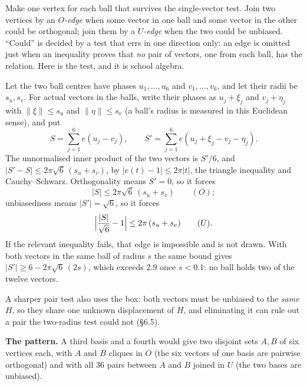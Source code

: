 \documentclass[11pt]{article}
\newcommand{\abs}[1]{\lvert #1\rvert}
\newcommand{\norm}[1]{\lVert #1\rVert}
\newcommand{\key}[1]{\par\Needspace{4\baselineskip}\medskip\noindent{\normalsize\bfseries #1}\par\nobreak\vspace{-1pt}}
\begin{document}
\key{5.\ Two graphs, and the pattern}

Make one vertex for each ball that survives the single-vector test. Join two vertices by an
\emph{$O$-edge} when some vector in one ball and some vector in the other could be orthogonal; join them
by a \emph{$U$-edge} when the two could be unbiased. ``Could'' is decided by a test that errs in one
direction only: an edge is omitted just when an inequality proves that \emph{no} pair of vectors, one
from each ball, has the relation. Here is the test, and it is school algebra.

Let the two ball centres have phases $u_1,\dots,u_6$ and $v_1,\dots,v_6$, and let their radii be
$s_u,s_v$. For actual vectors in the balls, write their phases as $u_j+\xi_j$ and $v_j+\eta_j$ with
$\norm{\xi}\le s_u$ and $\norm{\eta}\le s_v$ (a ball's radius is measured in this Euclidean sense), and
put
\[
S=\sum_{j=1}^6 e(u_j-v_j),\qquad S'=\sum_{j=1}^6 e(u_j+\xi_j-v_j-\eta_j).
\]
The unnormalised inner product of the two vectors is $S'/6$, and $\abs{S'-S}\le2\pi\sqrt6\,(s_u+s_v)$,
by $\abs{e(t)-1}\le2\pi\abs t$, the triangle inequality and Cauchy--Schwarz. Orthogonality means
$S'=0$, so it forces
\[
\abs S\le2\pi\sqrt6\,(s_u+s_v)\qquad(O);
\]
unbiasedness means $\abs{S'}=\sqrt6$, so it forces
\[
\Bigl|\frac{\abs S}{\sqrt6}-1\Bigr|\le2\pi\,(s_u+s_v)\qquad(U).
\]
If the relevant inequality fails, that edge is impossible and is not drawn. With both vectors in the
same ball of radius $s$ the same bound gives $\abs{S'}\ge6-2\pi\sqrt6\,(2s)$, which exceeds $2.9$ once
$s<0.1$: no ball holds two of the twelve vectors.

A sharper pair test also uses the box: both vectors must be unbiased to the \emph{same} $H$, so they
share one unknown displacement of $H$, and eliminating it can rule out a pair the two-radius test could
not (\S6.5).

\smallskip
\noindent
\textbf{The pattern.} A third basis and a fourth would give two disjoint sets $A,B$ of six vertices
each, with $A$ and $B$ cliques in $O$ (the six vectors of one basis are pairwise orthogonal) and with
all $36$ pairs between $A$ and $B$ joined in $U$ (the two bases are unbiased).

\begin{center}
\end{center}
\end{document}
